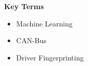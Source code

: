 %
%
% 
% 
% 


{\Large\bfseries Key Terms}
\vspace{0.65cm}

\begin{itemize}
	\setlength{\itemsep}{0pt}
	\item[] Machine Learning
	\item[] CAN-Bus
	\item[] Driver Fingerprinting
\end{itemize}
